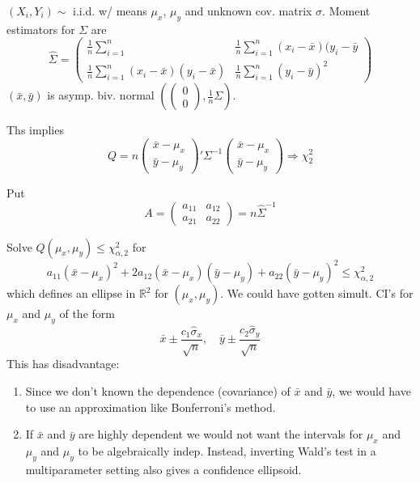 \documentclass[english, 11pt]{article}
\newcommand{\lp}{\left(}
\newcommand{\rp}{\right)}
\begin{document}
\begin{exmp}\label{exmp:618}
$(X_i, Y_i)\sim$ i.i.d. w/ means $\mu_x$, $\mu_y$ and unknown cov. matrix $\sigma$. Moment estimators for $\Sigma$ are
$$
\hat{\Sigma}=\lp\begin{matrix}
\frac{1}{n}\sum_{i=1}^n &\frac{1}{n}\sum_{i=1}^n(x_i-\bar{x})(y_i-\bar{y}\\
\frac{1}{n}\sum_{i=1}^n(x_i-\bar{x})(y_i-\bar{x}) & \frac{1}{n}\sum_{i=1}^n(y_i-\bar{y})^2
\end{matrix}\rp
$$
$(\bar{x}, \bar{y})$ is asymp. biv. normal $\lp\lp\begin{matrix}
0\\0
\end{matrix}\rp, \frac{1}{n}\Sigma\rp$.

Ths implies 
$$
Q=n\lp\begin{matrix}
\bar{x}-\mu_x\\\bar{y}-\mu_y
\end{matrix}\rp'\Sigma^{-1}\lp\begin{matrix}\bar{x}-\mu_x\\\bar{y}-\mu_y\end{matrix}\rp\Rightarrow\chi^2_2
$$

Put
$$
A=\lp\begin{matrix}
a_11 &a_12\\
a_21 &a_22
\end{matrix}\rp=n\hat{\Sigma}^{-1}
$$

Solve $Q(\mu_x, \mu_y)\leqslant\chi_{\alpha, 2}^2$ for
$$
a_11(\bar{x}-\mu_x)^2+2a_{12}(\bar{x}-\mu_x)(\bar{y}-\mu_y)+a_{22}(\bar{y}-\mu_y)^2\leqslant\chi^2_{\alpha, 2}
$$
which defines an ellipse in $\mathbb{R}^2$ for $(\mu_x, \mu_y)$. We could have gotten simult. CI's for $\mu_x$ and $\mu_y$ of the form
$$
\bar{x}\pm \frac{c_1\hat{\sigma}_x}{\sqrt{n}}, \quad\bar{y}\pm \frac{c_2\hat{\sigma}_y}{\sqrt{n}}
$$
This has disadvantage:
\begin{enumerate}
\item Since we don't known the dependence (covariance) of $\bar{x}$ and $\bar{y}$, we would have to use an approximation like Bonferroni's method.
\item If $\bar{x}$ and $\bar{y}$ are highly dependent we would not want the intervals for $\mu_x$ and $\mu_y$ and $\mu_y$ to be algebraically indep. Instead, inverting Wald's test in a multiparameter setting also gives a confidence ellipsoid.
\end{enumerate}
\end{exmp}
\end{document}
